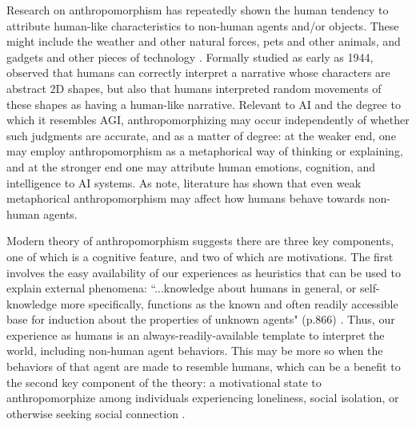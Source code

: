 \documentclass{article}
\theoremstyle{plain}
\theoremstyle{definition}
\theoremstyle{remark}
\begin{document}
Research on anthropomorphism has repeatedly shown the human tendency to attribute human-like characteristics to non-human agents and/or objects. These might include the weather and other natural forces, pets and other animals, and gadgets and other pieces of technology \cite{epley2007seeing}. Formally studied as early as 1944, \cite{heider1944experimental} observed that humans can correctly interpret a narrative whose characters are abstract 2D shapes, but also that humans interpreted random movements of these shapes as having a human-like narrative. 
Relevant to AI and the degree to which it resembles AGI, anthropomorphizing may occur independently of whether such judgments are accurate, and as a matter of degree: at the weaker end, one may employ anthropomorphism as a metaphorical way of thinking or explaining, and at the stronger end one may attribute human emotions, cognition, and intelligence to AI systems. As \citet{epley2007seeing} note, literature has shown that even weak metaphorical anthropomorphism may affect how humans behave towards non-human agents.

Modern theory of anthropomorphism suggests there are three key components, one of which is a cognitive feature, and two of which are motivations. The first involves the easy availability of our experiences as heuristics that can be used to explain external phenomena: ``...knowledge about humans in general, or self-knowledge more specifically, functions as the known and often readily accessible base for induction about the properties of unknown agents" (p.866) \cite{epley2007seeing, waytz2010social}. Thus, our experience as humans is an always-readily-available template to interpret the world, including non-human agent behaviors. This may be more so when the behaviors of that agent are made to resemble humans, which can be a benefit to the second key component of the theory: a motivational state to anthropomorphize among individuals experiencing loneliness, social isolation, or otherwise seeking social connection \cite{epley2007seeing, waytz2010social}. 
\end{document}

